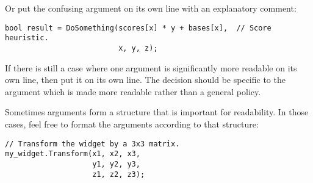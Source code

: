 Or put the confusing argument on its own line with an explanatory comment:
\begin{verbatim}
bool result = DoSomething(scores[x] * y + bases[x],  // Score heuristic.
                          x, y, z);
\end{verbatim}
If there is still a case where one argument is significantly more readable on its own line, then put it on its own line. The decision should be specific to the argument which is made more readable rather than a general policy.

Sometimes arguments form a structure that is important for readability. In those cases, feel free to format the arguments according to that structure:
\begin{verbatim}
// Transform the widget by a 3x3 matrix.
my_widget.Transform(x1, x2, x3,
                    y1, y2, y3,
                    z1, z2, z3);
\end{verbatim}
